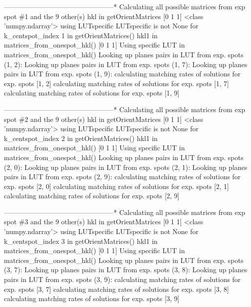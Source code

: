 \documentclass[letterpaper,10pt,english]{sphinxmanual}
\begin{document}
\begin{sphinxalltt}
\sphinxstyleemphasis{---***}------------------------------------------------*
Calculating all possible matrices from exp spot \#1 and the 9 other(s)
hkl in getOrientMatrices {[}0 1 1{]} \textless{}class 'numpy.ndarray'\textgreater{}
using LUTspecific
LUTspecific is not None for k\_centspot\_index 1 in getOrientMatrices()
hkl1 in matrices\_from\_onespot\_hkl() {[}0 1 1{]}
Using specific LUT in matrices\_from\_onespot\_hkl()
Looking up planes pairs in LUT from exp. spots (1, 2):
Looking up planes pairs in LUT from exp. spots (1, 7):
Looking up planes pairs in LUT from exp. spots (1, 9):
calculating matching rates of solutions for exp. spots {[}1, 2{]}
calculating matching rates of solutions for exp. spots {[}1, 7{]}
calculating matching rates of solutions for exp. spots {[}1, 9{]}


\sphinxstyleemphasis{---***}------------------------------------------------*
Calculating all possible matrices from exp spot \#2 and the 9 other(s)
hkl in getOrientMatrices {[}0 1 1{]} \textless{}class 'numpy.ndarray'\textgreater{}
using LUTspecific
LUTspecific is not None for k\_centspot\_index 2 in getOrientMatrices()
hkl1 in matrices\_from\_onespot\_hkl() {[}0 1 1{]}
Using specific LUT in matrices\_from\_onespot\_hkl()
Looking up planes pairs in LUT from exp. spots (2, 0):
Looking up planes pairs in LUT from exp. spots (2, 1):
Looking up planes pairs in LUT from exp. spots (2, 9):
calculating matching rates of solutions for exp. spots {[}2, 0{]}
calculating matching rates of solutions for exp. spots {[}2, 1{]}
calculating matching rates of solutions for exp. spots {[}2, 9{]}


\sphinxstyleemphasis{---***}------------------------------------------------*
Calculating all possible matrices from exp spot \#3 and the 9 other(s)
hkl in getOrientMatrices {[}0 1 1{]} \textless{}class 'numpy.ndarray'\textgreater{}
using LUTspecific
LUTspecific is not None for k\_centspot\_index 3 in getOrientMatrices()
hkl1 in matrices\_from\_onespot\_hkl() {[}0 1 1{]}
Using specific LUT in matrices\_from\_onespot\_hkl()
Looking up planes pairs in LUT from exp. spots (3, 7):
Looking up planes pairs in LUT from exp. spots (3, 8):
Looking up planes pairs in LUT from exp. spots (3, 9):
calculating matching rates of solutions for exp. spots {[}3, 7{]}
calculating matching rates of solutions for exp. spots {[}3, 8{]}
calculating matching rates of solutions for exp. spots {[}3, 9{]}



\end{sphinxalltt}
\end{document}
